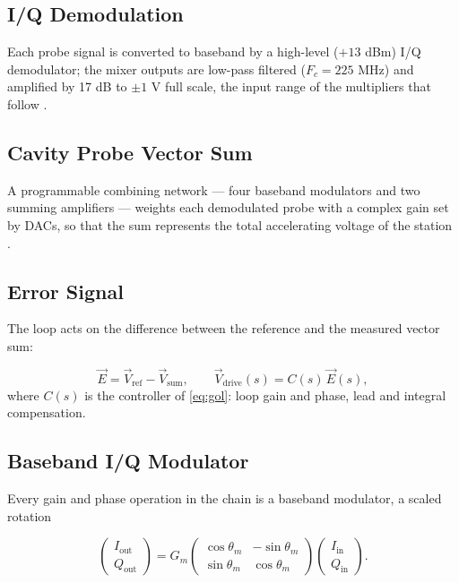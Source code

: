 \subsection{I/Q Demodulation}\label{sec:iq-demod}

Each probe signal is converted to baseband by a high-level (\(+13\) dBm) I/Q demodulator; the mixer outputs are low-pass filtered (\(F_c = 225\) MHz) and amplified by 17 dB to \(\pm 1\) V full scale, the input range of the multipliers that follow .

\subsection{Cavity Probe Vector Sum}\label{sec:iq-vectorsum}

A programmable combining network --- four baseband modulators and two summing amplifiers --- weights each demodulated probe with a complex gain set by DACs, so that the sum represents the total accelerating voltage of the station .

\subsection{Error Signal}\label{sec:iq-error}

The loop acts on the difference between the reference and the measured vector sum:

\begin{equation}\label{eq:err}
\vec{E} = \vec{V}_\text{ref} - \vec{V}_\text{sum},
\qquad
\vec{V}_\text{drive}(s) = C(s)\,\vec{E}(s),
\end{equation}
where \(C(s)\) is the controller of \cref{eq:gol}: loop gain and phase, lead and integral compensation.

\subsection{Baseband I/Q Modulator}\label{sec:iq-modulator}

Every gain and phase operation in the chain is a baseband modulator, a scaled rotation

\begin{equation}\label{eq:iq-mod}
\begin{pmatrix} I_\text{out} \\ Q_\text{out} \end{pmatrix} = G_m \begin{pmatrix} \cos\theta_m & -\sin\theta_m \\ \sin\theta_m & \cos\theta_m \end{pmatrix} \begin{pmatrix} I_\text{in} \\ Q_\text{in} \end{pmatrix}.
\end{equation}

